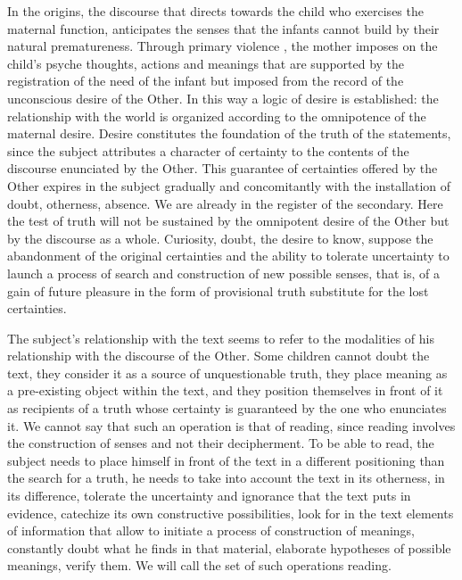 \documentclass[english]{textolivre}
\begin{document}
In the origins, the discourse that directs towards the child who exercises the maternal function, anticipates the senses that the infants cannot build by their natural prematureness. Through primary violence \cite{aulagnier_violencia_1975}, the mother imposes on the child's psyche thoughts, actions and meanings that are supported by the registration of the need of the infant but imposed from the record of the unconscious desire of the Other. In this way a logic of desire is established: the relationship with the world is organized according to the omnipotence of the maternal desire. Desire constitutes the foundation of the truth of the statements, since the subject attributes a character of certainty to the contents of the discourse enunciated by the Other. This guarantee of certainties offered by the Other expires in the subject gradually and concomitantly with the installation of doubt, otherness, absence. We are already in the register of the secondary. Here the test of truth will not be sustained by the omnipotent desire of the Other but by the discourse as a whole. Curiosity, doubt, the desire to know, suppose the abandonment of the original certainties and the ability to tolerate uncertainty to launch a process of search and construction of new possible senses, that is, of a gain of future pleasure in the form of provisional truth substitute for the lost certainties.

The subject's relationship with the text seems to refer to the modalities of his relationship with the discourse of the Other. Some children cannot doubt the text, they consider it as a source of unquestionable truth, they place meaning as a pre-existing object within the text, and they position themselves in front of it as recipients of a truth whose certainty is guaranteed by the one who enunciates it. We cannot say that such an operation is that of reading, since reading involves the construction of senses and not their decipherment. To be able to read, the subject needs to place himself in front of the text in a different positioning than the search for a truth, he needs to take into account the text in its otherness, in its difference, tolerate the uncertainty and ignorance that the text puts in evidence, catechize its own constructive possibilities, look for in the text elements of information that allow to initiate a process of construction of meanings, constantly doubt what he finds in that material, elaborate hypotheses of possible meanings, verify them. We will call the set of such operations reading.
\end{document}
